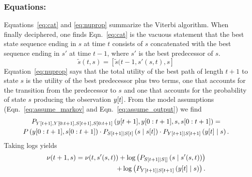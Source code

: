 \subsubsection*{Equations:}
Equations~\eqref{eq:cat} and \eqref{eq:nuprop} summarize the Viterbi
algorithm.  When finally deciphered, one finds Eqn.~\eqref{eq:cat} is
the vacuous statement that the best state sequence ending in $s$ at
time $t$ consists of $s$ concatenated with the best sequence ending
in $s'$ at time $t-1$, where $s'$ is the best predecessor of $s$.
\begin{equation}
  \label{eq:cat}
  \tilde s(t,s) = \left[ \tilde s(t-1,s'(s,t),s \right]
\end{equation}
Equation~\eqref{eq:nuprop} says that the total utility of the best
path of length $t+1$ to state $s$ is the utility of the best
predecessor plus two terms, one that accounts for the transition from
the predecessor to $s$ and one that accounts for the probability of
state $s$ producing the observation ${y}{[t]}$.  From the model
assumptions (Eqn.~\eqref{eq:assume_markov} and
Eqn.~\eqref{eq:assume_output}) we find
\begin{multline*}
  P_{{Y}{[t+1]},Y[0:t+1],{S}{[t+1]},S[0:t+1]}
  \left({y}{[t+1]},y[0:t+1],s,s[0:t+1] \right) =\\
  P\left(y[0:t+1], s[0:t+1] \right) \cdot
  P_{{S}{[t+1]}\mid {S}{[t]}} \left(s\mid {s}{[t]} \right) \cdot
  P_{{Y}{[t+1]}\mid {S}{[t+1]}} \left({y}{[t]}\mid s \right).
\end{multline*}
Taking logs yields
\begin{equation}
  \label{eq:nuprop}
  \begin{split}
    \nu (t+1,s) = \nu(t,s'(s,t)) +
    \log\left(P_{{S}{[t+1]}\mid {S}{[]}} \left(s\mid s'(s,t) \right)\right)\\
    \quad + \log \left( P_{{Y}{[t+1]}\mid {S}{[t+1]}}
      \left({y}{[t]}\mid s\right)\right).
  \end{split}
\end{equation}

